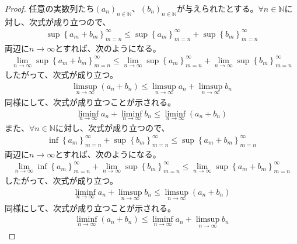\documentclass[dvipdfmx]{jsarticle}
\begin{document}
\begin{proof}
任意の実数列たち$\left( a_{n} \right)_{n \in \mathbb{N}}$、$\left( b_{n} \right)_{n \in \mathbb{N}}$が与えられたとする。$\forall n \in \mathbb{N}$に対し、次式が成り立つので、
\begin{align*}
\sup\left\{ a_{m} + b_{m} \right\}_{m = n}^{\infty} \leq \sup\left\{ a_{m} \right\}_{m = n}^{\infty} + \sup\left\{ b_{m} \right\}_{m = n}^{\infty}
\end{align*}
両辺に$n \rightarrow \infty$とすれば、次のようになる。
\begin{align*}
\lim_{n \rightarrow \infty}{\sup\left\{ a_{m} + b_{m} \right\}_{m = n}^{\infty}} \leq \lim_{n \rightarrow \infty}{\sup\left\{ a_{m} \right\}_{m = n}^{\infty}} + \lim_{n \rightarrow \infty}{\sup\left\{ b_{m} \right\}_{m = n}^{\infty}}
\end{align*}
したがって、次式が成り立つ。
\begin{align*}
\limsup_{n \rightarrow \infty}\left( a_{n} + b_{n} \right) \leq \limsup_{n \rightarrow \infty}a_{n} + \limsup_{n \rightarrow \infty}b_{n}
\end{align*}
同様にして、次式が成り立つことが示される。
\begin{align*}
\liminf_{n \rightarrow \infty}a_{n} + \liminf_{n \rightarrow \infty}b_{n} \leq \liminf_{n \rightarrow \infty}\left( a_{n} + b_{n} \right)
\end{align*}
また、$\forall n \in \mathbb{N}$に対し、次式が成り立つので、
\begin{align*}
\inf\left\{ a_{m} \right\}_{m = n}^{\infty} + \sup\left\{ b_{m} \right\}_{m = n}^{\infty} \leq \sup\left\{ a_{m} + b_{m} \right\}_{m = n}^{\infty}
\end{align*}
両辺に$n \rightarrow \infty$とすれば、次のようになる。
\begin{align*}
\lim_{n \rightarrow \infty}{\inf\left\{ a_{m} \right\}_{m = n}^{\infty}} + \lim_{n \rightarrow \infty}{\sup\left\{ b_{m} \right\}_{m = n}^{\infty}} \leq \lim_{n \rightarrow \infty}{\sup\left\{ a_{m} + b_{m} \right\}_{m = n}^{\infty}}
\end{align*}
したがって、次式が成り立つ。
\begin{align*}
\liminf_{n \rightarrow \infty}a_{n} + \limsup_{n \rightarrow \infty}b_{n} \leq \limsup_{n \rightarrow \infty}\left( a_{n} + b_{n} \right)
\end{align*}
同様にして、次式が成り立つことが示される。
\begin{align*}
\liminf_{n \rightarrow \infty}\left( a_{n} + b_{n} \right) \leq \liminf_{n \rightarrow \infty}a_{n} + \limsup_{n \rightarrow \infty}b_{n}

\end{align*}
\end{proof}
\end{document}
